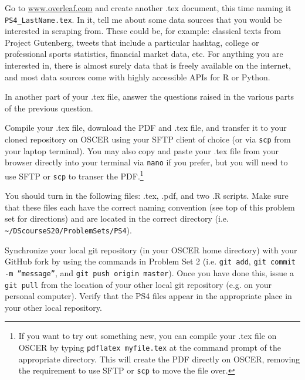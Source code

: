 \documentclass[12pt,english]{exam}
\begin{document}
\begin{questions}
\question Go to \url{www.overleaf.com} and create another .tex document, this time naming it \texttt{PS4\_LastName.tex}. In it, tell me about some data sources that you would be interested in scraping from. These could be, for example: classical texts from Project Gutenberg, tweets that include a particular hashtag, college or professional sports statistics, financial market data, etc. For anything you are interested in, there is almost surely data that is freely available on the internet, and most data sources come with highly accessible APIs for R or Python.

In another part of your .tex file, answer the questions raised in the various parts of the previous question.

\question Compile your .tex file, download the PDF and .tex file, and transfer it to your cloned repository on OSCER using your SFTP client of choice (or via \texttt{scp} from your laptop terminal). You may also copy and paste your .tex file from your browser directly into your terminal via \texttt{nano} if you prefer, but you will need to use SFTP or \texttt{scp} to transer the PDF.\footnote{If you want to try out something new, you can compile your .tex file on OSCER by typing \texttt{pdflatex myfile.tex} at the command prompt of the appropriate directory. This will create the PDF directly on OSCER, removing the requirement to use SFTP or \texttt{scp} to move the file over.}

\question You should turn in the following files: .tex, .pdf,  and two .R scripts.  Make sure that these files each have the correct naming convention (see top of this problem set for directions) and are located in the correct directory (i.e. \texttt{\textasciitilde/DScourseS20/ProblemSets/PS4}).

\question Synchronize your local git repository (in your OSCER home directory) with your GitHub fork by using the commands in Problem Set 2 (i.e. \texttt{git add}, \texttt{git commit -m ''message''}, and \texttt{git push origin master}). Once you have done this, issue a \texttt{git pull} from the location of your other local git repository (e.g. on your personal computer). Verify that the PS4 files appear in the appropriate place in your other local repository.

\end{questions}
\end{document}
